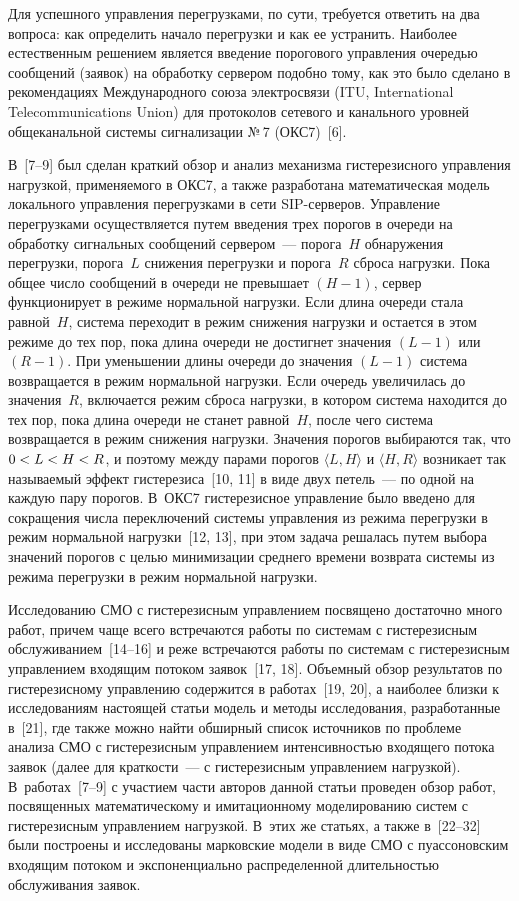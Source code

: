 \begin{multicols}{2}
Для успешного управления перегрузками, по сути, требуется ответить
на два вопроса: как определить начало перегрузки и как ее устранить.
Наиболее естественным решением является введение порогового
управления очередью сообщений (заявок) на обработку сервером подобно
тому, как это было сделано в рекомендациях Международного союза
электросвязи (ITU, International Telecommunications Union) для
протоколов сетевого и канального уровней общеканальной системы
сигнализации №\,7 (ОКС7)~[6]. 

В~[7--9] был сделан краткий обзор и
анализ механизма гистерезисного управ\-ле\-ния на\-груз\-кой, \mbox{применяемого} в
ОКС7, а также разработана математическая модель локального
управ\-ле\-ния перегрузками в сети SIP-сер\-ве\-ров. Управ\-ле\-ние перегрузками
осуществляется путем введения трех поро\-гов в очереди на обработку
сигнальных сообщений сервером~--- порога~$H$ обнаружения перегрузки,
порога~$L$ снижения перегрузки и порога~$R$ сброса нагрузки. Пока
общее число сообщений в очереди не превышает $(H-1)$, сервер
функционирует в режиме нормальной нагрузки. Если длина очереди стала
равной~$H$, сис\-те\-ма переходит в режим снижения нагрузки и остается в
этом режиме до тех пор, пока длина очереди не достигнет значения
$(L-1)$ или $(R-1)$. При уменьшении длины очереди до значения
$(L-1)$ система возвращается в режим нормальной нагрузки. Если
очередь увеличилась до значения~$R$, включается режим сброса
нагрузки, в котором система находится до тех пор, пока длина очереди
не станет равной~$H$, после чего система возвращается в режим
снижения нагрузки. Значения порогов выбираются так, что $0\hm<L<H\hm<R$, и
поэтому между парами порогов $\langle L,H \rangle$ и $\langle H,R
\rangle$ возникает так называемый эффект гистерезиса~[10, 11] в виде
двух петель~--- по одной на каждую пару порогов. В~ОКС7
гистерезисное управление было введено для сокращения числа
переключений системы управления из режима перегрузки в режим
нормальной нагрузки~[12, 13], при этом задача решалась путем выбора
значений порогов с целью минимизации среднего времени возврата
системы из режима перегрузки в режим нормальной нагрузки.

Исследованию СМО с гистерезисным
управлением посвящено достаточно много работ, причем чаще всего
встречаются работы по сис\-те\-мам с гис\-те\-ре\-зис\-ным обслуживанием~[14--16] 
и реже встречаются работы по сис\-те\-мам с гистерезисным
\mbox{управ\-ле\-ни\-ем} входящим потоком заявок~[17, 18]. Объемный
обзор результатов по гистерезисному управ\-ле\-нию содержится в работах~[19, 20], 
а наиболее близки к исследованиям настоящей статьи модель
и методы исследования, разработанные в~[21], где также можно найти
обширный список источников по проблеме анализа СМО с гистерезисным
управ\-ле\-ни\-ем интенсивностью входящего потока заявок (далее для
крат\-кости~--- с гистерезисным управ\-ле\-ни\-ем нагрузкой). В~работах~[7--9] 
с участием час\-ти авторов данной статьи проведен обзор работ,
посвященных математическому и имитационному моделированию систем с
гистерезисным управ\-ле\-ни\-ем на\-груз\-кой. В~этих же статьях, а также в~[22--32] 
были построены и исследованы марковские модели в виде СМО с
пуассоновским входящим потоком и экспоненциально распределенной
длительностью обслуживания заявок.


\end{multicols}
